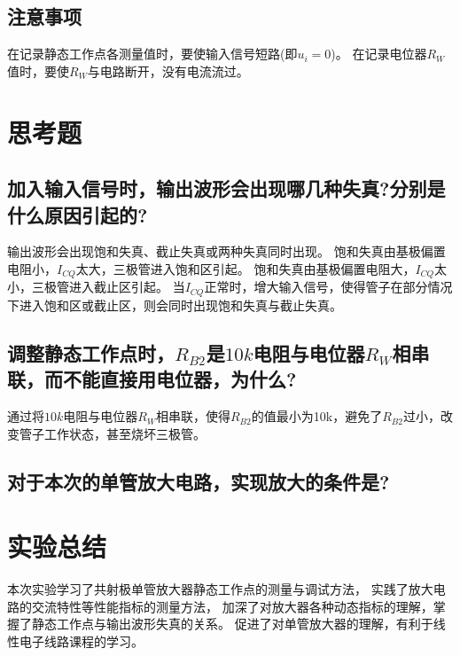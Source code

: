 \documentclass[a4paper]{article}
\begin{document}
    \subsection{注意事项}\label{subsec:20}
    {{在记录静态工作点各测量值时，要使输入信号短路(即$u_i=0$)。}}
    {{在记录电位器$R_W$值时，要使$R_W$与电路断开，没有电流流过。}}
    \vspace{1cm}


    \section{思考题}\label{sec:8}

    \subsection{加入输入信号时，输出波形会出现哪几种失真?分别是什么原因引起的?}\label{subsec:q1}
    {{输出波形会出现饱和失真、截止失真或两种失真同时出现。}}
    {{饱和失真由基极偏置电阻小，$I_{CQ}$太大，三极管进入饱和区引起。}}
    {{饱和失真由基极偏置电阻大，$I_{CQ}$太小，三极管进入截止区引起。}}
    {{当$I_{CQ}$正常时，增大输入信号，使得管子在部分情况下进入饱和区或截止区，则会同时出现饱和失真与截止失真。}}

    \subsection{调整静态工作点时，$R_{B2}$是$10k$电阻与电位器$R_W$相串联，而不能直接用电位器，为什么?}\label{subsec:q2}
    {{通过将$10k$电阻与电位器$R_W$相串联，使得$R_{B2}$的值最小为10k，避免了$R_{B2}$过小，改变管子工作状态，甚至烧坏三极管。}}

    \subsection{对于本次的单管放大电路，实现放大的条件是?}\label{subsec:q3}


    \vspace{1cm}


    \section{实验总结}\label{sec:9}
    {{本次实验学习了共射极单管放大器静态工作点的测量与调试方法， 实践了放大电路的交流特性等性能指标的测量方法，
    加深了对放大器各种动态指标的理解，掌握了静态工作点与输出波形失真的关系。
    促进了对单管放大器的理解，有利于线性电子线路课程的学习。}}
    \vspace{1cm}

    
    
\end{document}
